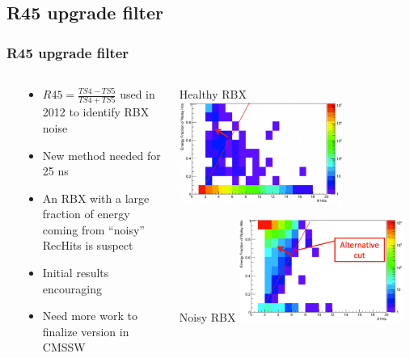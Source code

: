 \documentclass[bigger]{beamer}
\begin{document}
\subsection{R45 upgrade filter}
\label{sec-4-2}
\begin{frame}
\frametitle{R45 upgrade filter}
\label{sec-4-2-1}
\begin{columns} %
\label{sec-4-2-1-1}
\begin{column}{0.55\textwidth}
\label{sec-4-2-1-1-1}
\begin{itemize}

\item \(R45 = \frac{TS4 - TS5}{TS4 + TS5}\) used in 2012 to identify RBX noise
\label{sec-4-2-1-1-1-1}%

\item New method needed for 25 ns
\label{sec-4-2-1-1-1-2}%

\item An RBX with a large fraction of energy coming from ``noisy'' RecHits is suspect
\label{sec-4-2-1-1-1-3}%

\item Initial results encouraging
\label{sec-4-2-1-1-1-4}%

\item Need more work to finalize version in CMSSW
\label{sec-4-2-1-1-1-5}%
\end{itemize} %
\end{column}
\begin{column}{0.55\textwidth}
\label{sec-4-2-1-1-2}
\label{sec-4-2-1-1-2-1}

\centering
Healthy RBX
\includegraphics[width=0.7\textwidth]{fig/HealthyRBX.png}
\label{sec-4-2-1-1-2-2}

\centering
Noisy RBX
\includegraphics[width=0.7\textwidth]{fig/NoisyRBX.png}
\end{column}
\end{columns}
\end{frame}
\end{document}
